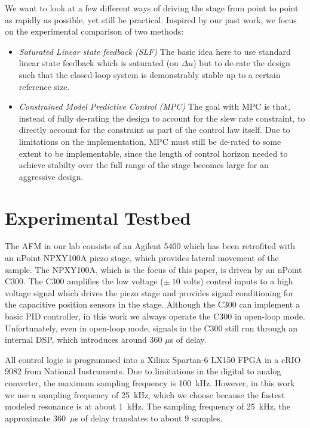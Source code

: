 \documentclass[journal,twocolumn,twoside]{IEEEtran}
\begin{document}
We want to look at a few different ways of driving the stage from point to point as rapidly as possible, yet still be practical. Inspired by our past work, we focus on the experimental comparison of two methods:
\begin{itemize}
\item\emph{Saturated Linear state feedback (SLF)} The basic idea here to use standard linear state feedback which is saturated (on $\Delta u$) but to de-rate the design such that the closed-loop system is demonstrably stable up to a certain reference size. 
\item\emph{Constrained Model Predictive Control (MPC)} The goal with MPC is that, instead of fully de-rating the design to account for the slew rate constraint, to directly account for the constraint as part of the control law itself. Due to limitations on the implementation, MPC must still be de-rated to some extent to be implementable, since the length of control horizon needed to achieve stabilty over the full range of the stage becomes large for an aggressive design.
\end{itemize}




\section{Experimental Testbed}\label{sec:testbed}
The AFM in our lab consists of an Agilent 5400 which has been retrofited with an nPoint NPXY100A piezo stage, which provides lateral movement of the sample. The NPXY100A, which is the focus of this paper, is driven by an nPoint C300. The C300 amplifies the low voltage ($\pm~10$ volts) control inputs to a high voltage signal which drives the piezo stage and provides signal conditioning for the capacitive position sensors in the stage. Although the C300 can implement a basic PID controller, in this work we always operate the C300 in open-loop mode. Unfortunately, even in open-loop mode, signals in the C300 still run through an internal DSP, which introduces around 360 $\mu$s of delay. 

All control logic is programmed into a Xilinx Spartan-6 LX150 FPGA in a cRIO 9082 from National Instruments. Due to limitations in the digital to analog converter, the maximum sampling frequency is 100~kHz. However, in this work we use a sampling frequency of 25~kHz, which we choose because the fastest modeled resonance is at about 1~kHz. The sampling frequency of 25~kHz, the approximate 360~$\mu$s of delay translates to about 9 samples.
\end{document}
